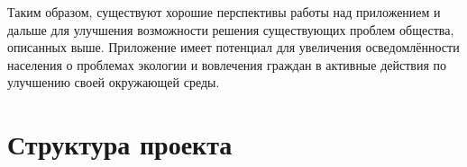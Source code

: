 \documentclass[diploma]{SCWorks}
\begin{document}
Таким образом, существуют хорошие перспективы работы над приложением и 
дальше для улучшения возможности решения существующих проблем общества, 
описанных выше. Приложение имеет потенциал для увеличения осведомлённости 
населения о проблемах экологии и вовлечения граждан в активные действия по 
улучшению своей окружающей среды.

\nocite{*}




\appendix

\section{Структура проекта}
\label{appendA}

\end{document}
